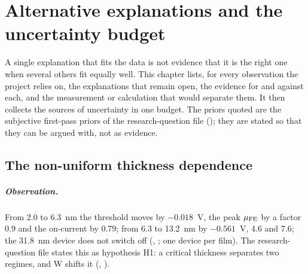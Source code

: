 \chapter{Alternative explanations and the uncertainty budget}
\label{ch:mono-alternatives}

A single explanation that fits the data is not evidence that it is the right one when several others fit equally well.
This chapter lists, for every observation the project relies on, the explanations that remain open, the evidence for
and against each, and the measurement or calculation that would separate them. It then collects the sources of
uncertainty in one budget. The priors quoted are the subjective first-pass priors of the research-question file
(); they are stated so that they can be argued with, not as evidence.

\section{The non-uniform thickness dependence}
\label{sec:mono-alt-tc}

\paragraph{Observation.} From 2.0 to 6.3~nm the threshold moves by $-0.018$~V, the peak $\mu_{\mathrm{FE}}$ by a factor 0.9 and the
on-current by 0.79; from 6.3 to 13.2~nm by $-0.561$~V, 4.6 and 7.6; the 31.8~nm device does not switch off
(, ; one device per film). The research-question file states this as hypothesis H1: a critical
thickness separates two regimes, and W shifts it (, ).

